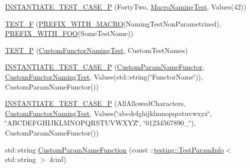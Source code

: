 \begin{DoxyCompactItemize}
\item 
\mbox{\hyperlink{_obj__test_2lib_2googletest-release-1_88_81_2googletest_2test_2googletest-param-test-test_8cc_a57f127249b7fcbce666fc162ee9c90d7}{I\+N\+S\+T\+A\+N\+T\+I\+A\+T\+E\+\_\+\+T\+E\+S\+T\+\_\+\+C\+A\+S\+E\+\_\+P}} (Forty\+Two, \mbox{\hyperlink{class_macro_naming_test}{Macro\+Naming\+Test}}, Values(42))
\item 
\mbox{\hyperlink{_obj__test_2lib_2googletest-release-1_88_81_2googletest_2test_2googletest-param-test-test_8cc_a025432fa6a1d1a07929f6897f2dfdaea}{T\+E\+S\+T\+\_\+F}} (\mbox{\hyperlink{_obj__test_2lib_2googletest-release-1_88_81_2googletest_2test_2googletest-param-test-test_8cc_aeb9b224f65fb5b0b8f2323a6903d6a68}{P\+R\+E\+F\+I\+X\+\_\+\+W\+I\+T\+H\+\_\+\+M\+A\+C\+RO}}(Naming\+Test\+Non\+Parametrized), \mbox{\hyperlink{_obj__test_2lib_2googletest-release-1_88_81_2googletest_2test_2googletest-param-test-test_8cc_a6414de581a925e7399b27c14e38f8a67}{P\+R\+E\+F\+I\+X\+\_\+\+W\+I\+T\+H\+\_\+\+F\+OO}}(Some\+Test\+Name))
\item 
\mbox{\hyperlink{_obj__test_2lib_2googletest-release-1_88_81_2googletest_2test_2googletest-param-test-test_8cc_a64b9799ff848fbf906c2e5c93a66434a}{T\+E\+S\+T\+\_\+P}} (\mbox{\hyperlink{class_custom_functor_naming_test}{Custom\+Functor\+Naming\+Test}}, Custom\+Test\+Names)
\item 
\mbox{\hyperlink{_obj__test_2lib_2googletest-release-1_88_81_2googletest_2test_2googletest-param-test-test_8cc_a4ff0a3d609ba73d519d096f1eb6bec29}{I\+N\+S\+T\+A\+N\+T\+I\+A\+T\+E\+\_\+\+T\+E\+S\+T\+\_\+\+C\+A\+S\+E\+\_\+P}} (\mbox{\hyperlink{struct_custom_param_name_functor}{Custom\+Param\+Name\+Functor}}, \mbox{\hyperlink{class_custom_functor_naming_test}{Custom\+Functor\+Naming\+Test}}, Values(std\+::string(\char`\"{}Functor\+Name\char`\"{})), Custom\+Param\+Name\+Functor())
\item 
\mbox{\hyperlink{_obj__test_2lib_2googletest-release-1_88_81_2googletest_2test_2googletest-param-test-test_8cc_a14b9b9d7ef2da5e030f760f5b54ae328}{I\+N\+S\+T\+A\+N\+T\+I\+A\+T\+E\+\_\+\+T\+E\+S\+T\+\_\+\+C\+A\+S\+E\+\_\+P}} (All\+Allowed\+Characters, \mbox{\hyperlink{class_custom_functor_naming_test}{Custom\+Functor\+Naming\+Test}}, Values(\char`\"{}abcdefghijklmnopqrstuvwxyz\char`\"{}, \char`\"{}A\+B\+C\+D\+E\+F\+G\+H\+I\+J\+K\+L\+M\+N\+O\+P\+Q\+R\+S\+T\+U\+V\+W\+X\+YZ\char`\"{}, \char`\"{}01234567890\+\_\+\char`\"{}), Custom\+Param\+Name\+Functor())
\item 
std\+::string \mbox{\hyperlink{_obj__test_2lib_2googletest-release-1_88_81_2googletest_2test_2googletest-param-test-test_8cc_a016a6f23e3fe3de5183e5493cf4bcc4f}{Custom\+Param\+Name\+Function}} (const \+::\mbox{\hyperlink{structtesting_1_1_test_param_info}{testing\+::\+Test\+Param\+Info}}$<$ std\+::string $>$ \&inf)

\end{DoxyCompactItemize}

